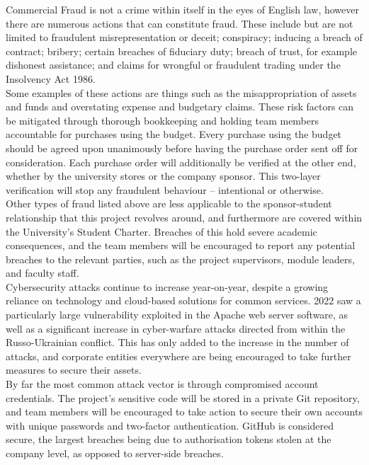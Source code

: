 \documentclass [12pt]{article}
\begin{document}
Commercial Fraud is not a crime within itself in the eyes of English law, however there are numerous actions that can constitute fraud. These include but are not limited to fraudulent misrepresentation or deceit; conspiracy; inducing a breach of contract; bribery; certain breaches of fiduciary duty; breach of trust, for example dishonest assistance; and claims for wrongful or fraudulent trading under the Insolvency Act 1986.
\\
Some examples of these actions are things such as the misappropriation of assets and funds and overstating expense and budgetary claims. These risk factors can be mitigated through thorough bookkeeping and holding team members accountable for purchases using the budget. Every purchase using the budget should be agreed upon unanimously before having the purchase order sent off for consideration. Each purchase order will additionally be verified at the other end, whether by the university stores or the company sponsor. This two-layer verification will stop any fraudulent behaviour – intentional or otherwise.
\\
Other types of fraud listed above are less applicable to the sponsor-student relationship that this project revolves around, and furthermore are covered within the University’s Student Charter. Breaches of this hold severe academic consequences, and the team members will be encouraged to report any potential breaches to the relevant parties, such as the project supervisors, module leaders, and faculty staff.
\\
Cybersecurity attacks continue to increase year-on-year, despite a growing reliance on technology and cloud-based solutions for common services. 2022 saw a particularly large vulnerability exploited in the Apache web server software, as well as a significant increase in cyber-warfare attacks directed from within the Russo-Ukrainian conflict. This has only added to the increase in the number of attacks, and corporate entities everywhere are being encouraged to take further measures to secure their assets.
\\
By far the most common attack vector is through compromised account credentials. The project’s sensitive code will be stored in a private Git repository, and team members will be encouraged to take action to secure their own accounts with unique passwords and two-factor authentication. GitHub is considered secure, the largest breaches being due to authorisation tokens stolen at the company level, as opposed to server-side breaches. 
\\
\end{document}
